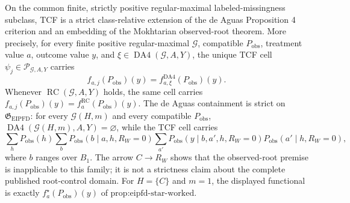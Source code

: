 On the common finite, strictly positive regular-maximal labeled-missingness subclass, TCF is a strict class-relative extension of the de Aguas Proposition 4 criterion and an embedding of the Mokhtarian observed-root theorem. More precisely, for every finite positive regular-maximal \(\mathcal G\), compatible \(P_{\mathrm{obs}}\), treatment value \(a\), outcome value \(y\), and \(\xi\in\operatorname{DA4}(\mathcal G,A,Y)\), the unique TCF cell \(\psi_j\in\mathscr P_{\mathcal G,A,Y}\) carries \[f_{a,j}(P_{\mathrm{obs}})(y)=f^{\mathrm{DA4}}_{a,\xi}(P_{\mathrm{obs}})(y).\] Whenever \(\operatorname{RC}(\mathcal G,A,Y)\) holds, the same cell carries \(f_{a,j}(P_{\mathrm{obs}})(y)=f_a^{\mathrm{RC}}(P_{\mathrm{obs}})(y)\). The de Aguas containment is strict on \(\mathfrak G_{\mathrm{EIPFD}}\): for every \(\mathcal G(H,m)\) and every compatible \(P_{\mathrm{obs}}\), \(\operatorname{DA4}(\mathcal G(H,m),A,Y)=\varnothing\), while the TCF cell carries \[\sum_hP_{\mathrm{obs}}(h)\sum_bP_{\mathrm{obs}}(b\mid a,h,R_W=0)\sum_{a'}P_{\mathrm{obs}}(y\mid b,a',h,R_W=0)P_{\mathrm{obs}}(a'\mid h,R_W=0),\] where \(b\) ranges over \(B_1\). The arrow \(C\to R_W\) shows that the observed-root premise is inapplicable to this family; it is not a strictness claim about the complete published root-control domain. For \(H=\{C\}\) and \(m=1\), the displayed functional is exactly \(f_a^\star(P_{\mathrm{obs}})(y)\) of \(\text{prop:eipfd-star-worked}\).